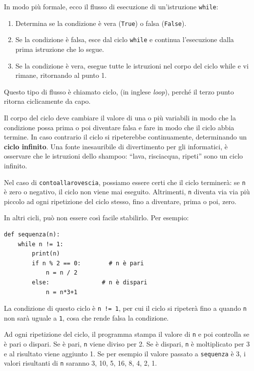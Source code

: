 \documentclass[10pt]{book}
\begin{document}
In modo più formale, ecco il flusso di esecuzione di un'istruzione {\tt while}:

\begin{enumerate}

\item Determina se la condizione è vera ({\tt True}) o falsa ({\tt False}).

\item Se la condizione è falsa, esce dal ciclo {\tt while} e continua       l'esecuzione dalla prima istruzione che lo segue.

\item Se la condizione è vera, esegue tutte le istruzioni nel corpo del ciclo while e vi rimane, ritornando al punto 1.

\end{enumerate}

Questo tipo di flusso è chiamato ciclo, (in inglese {\em loop}), perché il terzo punto ritorna ciclicamente da capo. 

Il corpo del ciclo deve cambiare il valore di una o più variabili in modo che la condizione possa prima o poi diventare falsa e fare in modo che il ciclo abbia termine. In caso contrario il ciclo si ripeterebbe continuamente, determinando un {\bf ciclo infinito}. Una fonte inesauribile di divertimento per gli informatici, è osservare che le istruzioni dello shampoo:
``lava, risciacqua, ripeti'' sono un ciclo infinito.


Nel caso di {\tt contoallarovescia}, possiamo essere certi che il ciclo terminerà: se {\tt n} è zero o negativo, il ciclo non viene mai eseguito. Altrimenti, {\tt n} diventa via via più piccolo ad ogni ripetizione del ciclo stesso, fino a diventare, prima o poi, zero. 

In altri cicli, può non essere così facile stabilirlo. Per esempio:

\begin{verbatim}
def sequenza(n):
    while n != 1:
        print(n)
        if n % 2 == 0:        # n è pari
            n = n / 2
        else:               # n è dispari
            n = n*3+1
\end{verbatim}
%
La condizione di questo ciclo è {\tt n != 1}, per cui il ciclo si ripeterà
fino a quando {\tt n} non sarà uguale a {\tt 1}, cosa che rende falsa la condizione.

Ad ogni ripetizione del ciclo, il programma stampa il valore di {\tt n} e poi controlla se è pari o dispari. Se è pari, {\tt n} viene diviso per 2. Se è dispari, {\tt n} è moltiplicato per 3 e al risultato viene aggiunto 1. Se per esempio il valore passato a {\tt sequenza} è 3, i valori risultanti di {\tt n} saranno 3, 10, 5, 16, 8, 4, 2, 1.
\end{document}
